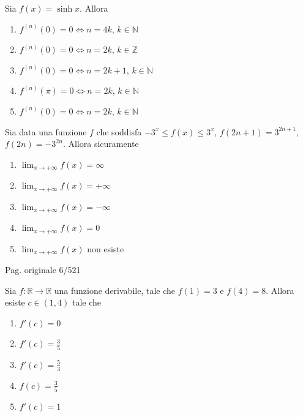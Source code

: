\begin{quiz}
Sia $f(x)=\sinh x$. Allora
\begin{enumerate}[label=\alph*),leftmargin=1.3cm,itemsep=3pt,topsep=5pt]\item $f^{(n)}(0)=0\iff n=4k$, $k\in\mathbb N$\item $f^{(n)}(0)=0\iff n=2k$, $k\in\mathbb Z$\item $f^{(n)}(0)=0\iff n=2k+1$, $k\in\mathbb N$\item $f^{(n)}(\pi)=0\iff n=2k$, $k\in\mathbb N$\item $f^{(n)}(0)=0\iff n=2k$, $k\in\mathbb N$\end{enumerate}
\end{quiz}

\begin{quiz}
Sia data una funzione $f$ che soddisfa $-3^x\le f(x)\le3^x$, $f(2n+1)=3^{2n+1}$, $f(2n)=-3^{2n}$. Allora sicuramente
\begin{enumerate}[label=\alph*),leftmargin=1.3cm,itemsep=3pt,topsep=5pt]\item $\lim_{x\to+\infty}f(x)=\infty$\item $\lim_{x\to+\infty}f(x)=+\infty$\item $\lim_{x\to+\infty}f(x)=-\infty$\item $\lim_{x\to+\infty}f(x)=0$\item $\lim_{x\to+\infty}f(x)$ non esiste\end{enumerate}
\end{quiz}

\par\noindent\hfill{\color{cyan!65!black}\scriptsize Pag. originale 6/521}\par\smallskip
\begin{quiz}
Sia $f:\mathbb R\to\mathbb R$ una funzione derivabile, tale che $f(1)=3$ e $f(4)=8$. Allora esiste $c\in(1,4)$ tale che
\begin{enumerate}[label=\alph*),leftmargin=1.3cm,itemsep=3pt,topsep=5pt]\item $f'(c)=0$\item $f'(c)=\frac35$\item $f'(c)=\frac53$\item $f(c)=\frac35$\item $f'(c)=1$\end{enumerate}
\end{quiz}

